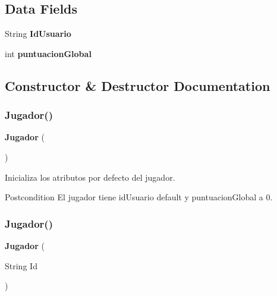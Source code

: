 \subsection*{Data Fields}
\begin{DoxyCompactItemize}
\item 
\mbox{\label{class_dominio_1_1clases_1_1_jugador_a0f510b17406989a7eb1babcb29b6a0e2}} 
String {\bfseries Id\+Usuario}
\item 
\mbox{\label{class_dominio_1_1clases_1_1_jugador_aae2dc4a112e53d90c0fbf7b7dfc77d67}} 
int {\bfseries puntuacion\+Global}
\end{DoxyCompactItemize}


\subsection{Constructor \& Destructor Documentation}
\mbox{\label{class_dominio_1_1clases_1_1_jugador_a4ffb6f309c64b2a0aa980b7dc7f07a45}} 
\subsubsection{Jugador()\hspace{0.1cm}{\footnotesize\ttfamily [1/2]}}
{\footnotesize\ttfamily \textbf{ Jugador} (\begin{DoxyParamCaption}{ }\end{DoxyParamCaption})\hspace{0.3cm}{\ttfamily [inline]}}



Inicializa los atributos por defecto del jugador. 

\begin{DoxyPostcond}{Postcondition}
El jugador tiene id\+Usuario default y puntuacion\+Global a 0. 
\end{DoxyPostcond}
\mbox{\label{class_dominio_1_1clases_1_1_jugador_ab68a72d2355a9d3fb6d3308afdfa343e}} 
\subsubsection{Jugador()\hspace{0.1cm}{\footnotesize\ttfamily [2/2]}}
{\footnotesize\ttfamily \textbf{ Jugador} (\begin{DoxyParamCaption}\item[{String}]{Id }\end{DoxyParamCaption})\hspace{0.3cm}{\ttfamily [inline]}}



